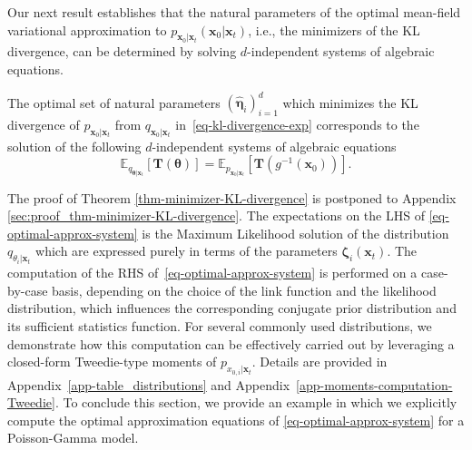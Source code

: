Our next result establishes that the natural parameters of the optimal mean-field variational approximation to  $p_{\mathbf{x}_0\vert \mathbf{x}_t}(\mathbf{x}_{0}\vert \mathbf{x}_{t})$, i.e., the minimizers of the KL divergence, can be determined by solving $d$-independent systems of algebraic equations. 
\begin{theorem}
\label{thm-minimizer-KL-divergence}  
The optimal set of natural parameters $(\hat{\boldsymbol{\eta}}_{i})_{i=1}^{d}$ which minimizes the KL divergence of $p_{\mathbf{x}_0\vert \mathbf{x}_t}$ from $q_{\mathbf{x}_0\vert \mathbf{x}_t}$ in~\eqref{eq-kl-divergence-exp} corresponds to the solution of the following $d$-independent systems of algebraic equations
\begin{equation}
\label{eq-optimal-approx-system}
     \mathbb{E}_{q_{\boldsymbol{\theta}\vert \mathbf{x}_t}}[\mathbf{T}(\boldsymbol{\theta})] = \mathbb{E}_{p_{\mathbf{x}_{0}\vert \mathbf{x}_t}}[ \mathbf{T}(g^{-1}(\mathbf{x}_{0}))].
\end{equation}
\end{theorem}
The proof of Theorem \ref{thm-minimizer-KL-divergence} is postponed to Appendix \ref{sec:proof_thm-minimizer-KL-divergence}. 
The expectations on the LHS of \eqref{eq-optimal-approx-system} is the Maximum Likelihood solution of the distribution $q_{\theta_i\vert \mathbf{x}_t}$ which are expressed purely in terms of the parameters $\boldsymbol{\zeta}_i(\mathbf{x}_{t})$.
The computation of the RHS of~\eqref{eq-optimal-approx-system} is performed on a case-by-case basis, depending on the choice of the link function and the likelihood distribution, which influences the corresponding conjugate prior distribution and its sufficient statistics function. For several commonly used distributions, we demonstrate how this computation can be effectively carried out by leveraging a closed-form Tweedie-type moments of $p_{{x}_{0,i} \vert \mathbf{x}_t}$. Details are provided in Appendix~\ref{app-table_distributions} and Appendix~\ref{app-moments-computation-Tweedie}.
To conclude this section, we provide an example in which we explicitly compute the optimal approximation equations of \eqref{eq-optimal-approx-system} for a Poisson-Gamma model.

